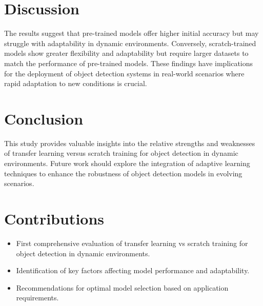 \documentclass{article}
\begin{document}
\section{Discussion}
The results suggest that pre-trained models offer higher initial accuracy but may struggle with adaptability in dynamic environments. Conversely, scratch-trained models show greater flexibility and adaptability but require larger datasets to match the performance of pre-trained models. These findings have implications for the deployment of object detection systems in real-world scenarios where rapid adaptation to new conditions is crucial.

\section{Conclusion}
This study provides valuable insights into the relative strengths and weaknesses of transfer learning versus scratch training for object detection in dynamic environments. Future work should explore the integration of adaptive learning techniques to enhance the robustness of object detection models in evolving scenarios.

\section{Contributions}
\begin{itemize}
    \item First comprehensive evaluation of transfer learning vs scratch training for object detection in dynamic environments.
    \item Identification of key factors affecting model performance and adaptability.
    \item Recommendations for optimal model selection based on application requirements.
\end{itemize}



\end{document}
